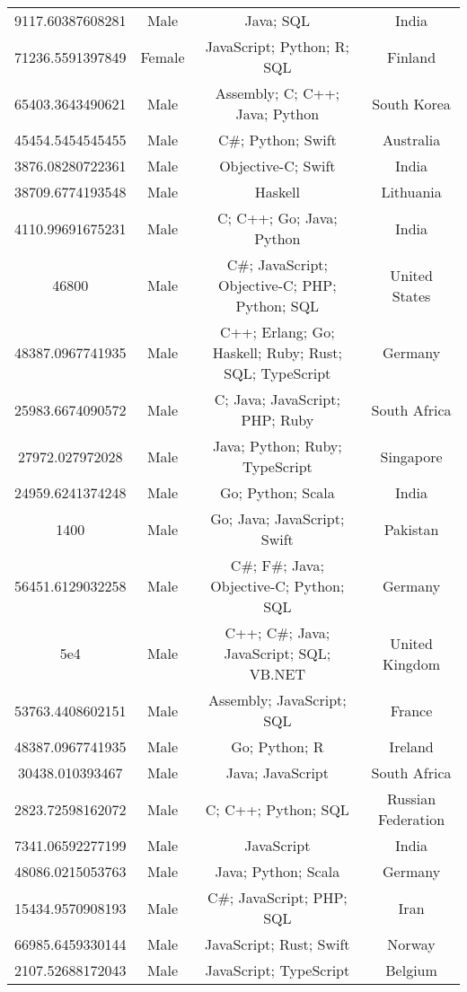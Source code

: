 \begin{center}
\begin{tabular}{ |c|c|c|c| }
9117.60387608281  &  Male  &  Java; SQL  &  India  \\ 
71236.5591397849  &  Female  &  JavaScript; Python; R; SQL  &  Finland  \\ 
65403.3643490621  &  Male  &  Assembly; C; C++; Java; Python  &  South Korea  \\ 
45454.5454545455  &  Male  &  C\#; Python; Swift  &  Australia  \\ 
3876.08280722361  &  Male  &  Objective-C; Swift  &  India  \\ 
38709.6774193548  &  Male  &  Haskell  &  Lithuania  \\ 
4110.99691675231  &  Male  &  C; C++; Go; Java; Python  &  India  \\ 
46800  &  Male  &  C\#; JavaScript; Objective-C; PHP; Python; SQL  &  United States  \\ 
48387.0967741935  &  Male  &  C++; Erlang; Go; Haskell; Ruby; Rust; SQL; TypeScript  &  Germany  \\ 
25983.6674090572  &  Male  &  C; Java; JavaScript; PHP; Ruby  &  South Africa  \\ 
27972.027972028  &  Male  &  Java; Python; Ruby; TypeScript  &  Singapore  \\ 
24959.6241374248  &  Male  &  Go; Python; Scala  &  India  \\ 
1400  &  Male  &  Go; Java; JavaScript; Swift  &  Pakistan  \\ 
56451.6129032258  &  Male  &  C\#; F\#; Java; Objective-C; Python; SQL  &  Germany  \\ 
5e4  &  Male  &  C++; C\#; Java; JavaScript; SQL; VB.NET  &  United Kingdom  \\ 
53763.4408602151  &  Male  &  Assembly; JavaScript; SQL  &  France  \\ 
48387.0967741935  &  Male  &  Go; Python; R  &  Ireland  \\ 
30438.010393467  &  Male  &  Java; JavaScript  &  South Africa  \\ 
2823.72598162072  &  Male  &  C; C++; Python; SQL  &  Russian Federation  \\ 
7341.06592277199  &  Male  &  JavaScript  &  India  \\ 
48086.0215053763  &  Male  &  Java; Python; Scala  &  Germany  \\ 
15434.9570908193  &  Male  &  C\#; JavaScript; PHP; SQL  &  Iran  \\ 
66985.6459330144  &  Male  &  JavaScript; Rust; Swift  &  Norway  \\ 
2107.52688172043  &  Male  &  JavaScript; TypeScript  &  Belgium  \\ 

\end{tabular}
\end{center}
